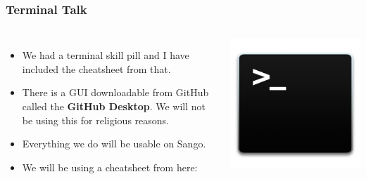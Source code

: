 \documentclass{beamer}
\begin{document}
\begin{frame}[fragile]
\frametitle{Terminal Talk}
\begin{columns}

\begin{itemize}
\item We had a terminal skill pill and I have included the cheatsheet from that. 
\item There is a GUI downloadable from GitHub called the \textbf{GitHub Desktop}. We will not be using this for religious reasons.
\item Everything we do will be usable on Sango.
\item We will be using a cheatsheet from here: \href{https://www.git-tower.com/learn/cheat-sheets/git}{\textbf{\color{blue}{https://www.git-tower.com/learn/cheat-sheets/git}}}
\end{itemize}

\includegraphics[width=\textwidth]{terminal.png}
\end{columns}
\end{frame}
\end{document}
